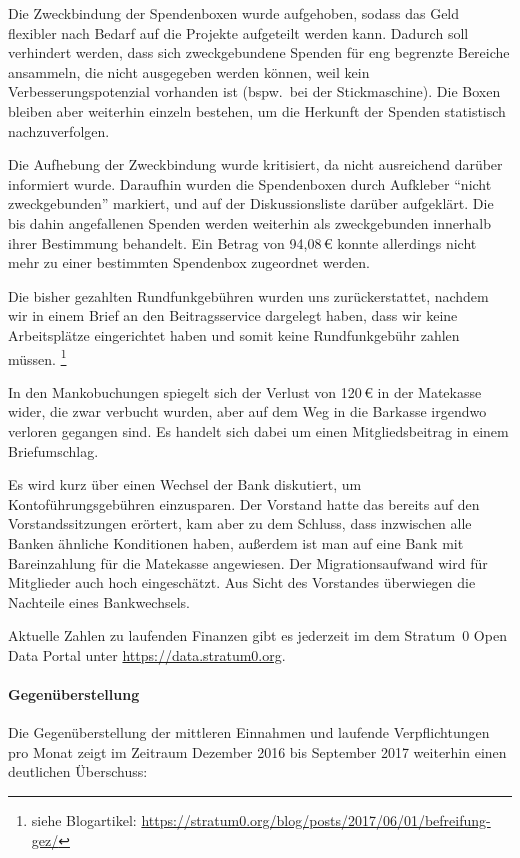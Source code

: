 \documentclass{s0minutes}
\begin{document}
Die Zweckbindung der Spendenboxen wurde aufgehoben, sodass das Geld flexibler
nach Bedarf auf die Projekte aufgeteilt werden kann. Dadurch soll verhindert
werden, dass sich zweckgebundene Spenden für eng begrenzte Bereiche ansammeln,
die nicht ausgegeben werden können, weil kein Verbesserungspotenzial vorhanden
ist (bspw.\, bei der Stickmaschine). Die Boxen bleiben aber weiterhin einzeln
bestehen, um die Herkunft der Spenden statistisch nachzuverfolgen.

Die Aufhebung der Zweckbindung wurde kritisiert, da nicht ausreichend darüber
informiert wurde. Daraufhin wurden die Spendenboxen durch Aufkleber "`nicht
zweckgebunden"' markiert, und auf der Diskussionsliste darüber aufgeklärt. Die
bis dahin angefallenen Spenden werden weiterhin als zweckgebunden innerhalb
ihrer Bestimmung behandelt. Ein Betrag von 94{,}08\,€ konnte allerdings nicht mehr
zu einer bestimmten Spendenbox zugeordnet werden.

Die bisher gezahlten Rundfunkgebühren wurden uns zurückerstattet, nachdem wir
in einem Brief an den Beitragsservice dargelegt haben, dass wir keine
Arbeitsplätze eingerichtet haben und somit keine Rundfunkgebühr zahlen müssen.%
\footnote{siehe Blogartikel: \url{https://stratum0.org/blog/posts/2017/06/01/befreifung-gez/}}

In den Mankobuchungen spiegelt sich der Verlust von 120\,€ in der Matekasse
wider, die zwar verbucht wurden, aber auf dem Weg in die Barkasse irgendwo
verloren gegangen sind. Es handelt sich dabei um einen Mitgliedsbeitrag in einem
Briefumschlag.

Es wird kurz über einen Wechsel der Bank diskutiert, um Kontoführungsgebühren
einzusparen. Der Vorstand hatte das bereits auf den Vorstandssitzungen erörtert,
kam aber zu dem Schluss, dass inzwischen alle Banken ähnliche Konditionen haben,
außerdem ist man auf eine Bank mit Bareinzahlung für die Matekasse angewiesen.
Der Migrationsaufwand wird für Mitglieder auch hoch eingeschätzt. Aus Sicht des
Vorstandes überwiegen die Nachteile eines Bankwechsels.

Aktuelle Zahlen zu laufenden Finanzen gibt es jederzeit im dem Stratum~0 Open
Data Portal unter \url{https://data.stratum0.org}.

\paragraph{Gegenüberstellung}
Die Gegenüberstellung der mittleren Einnahmen und laufende Verpflichtungen pro
Monat zeigt im Zeitraum Dezember 2016 bis September 2017 weiterhin einen
deutlichen Überschuss:
\end{document}
